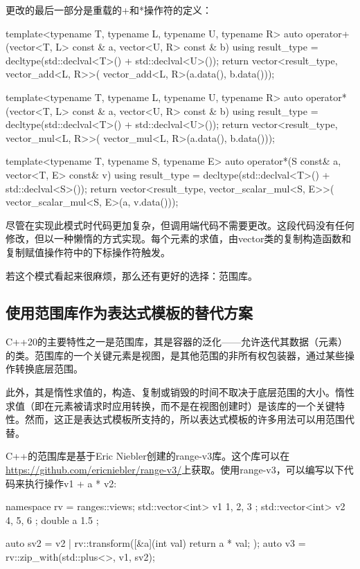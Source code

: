 更改的最后一部分是重载的+和*操作符的定义：

\begin{cppcode}
template<typename T, typename L, typename U, typename R>
auto operator+(vector<T, L> const & a,
vector<U, R> const & b)
{
	using result_type = decltype(std::declval<T>() +
								 std::declval<U>());
	return vector<result_type, vector_add<L, R>>(
		vector_add<L, R>(a.data(), b.data()));
}

template<typename T, typename L, typename U, typename R>
auto operator*(vector<T, L> const & a,
vector<U, R> const & b)
{
	using result_type = decltype(std::declval<T>() +
								 std::declval<U>());
	return vector<result_type, vector_mul<L, R>>(
		vector_mul<L, R>(a.data(), b.data()));
}

template<typename T, typename S, typename E>
auto operator*(S const& a, vector<T, E> const& v)
{
	using result_type = decltype(std::declval<T>() +
								 std::declval<S>());
	return vector<result_type, vector_scalar_mul<S, E>>(
		vector_scalar_mul<S, E>(a, v.data()));
}
\end{cppcode}

尽管在实现此模式时代码更加复杂，但调用端代码不需要更改。这段代码没有任何修改，但以一种懒惰的方式实现。每个元素的求值，由vector类的复制构造函数和复制赋值操作符中的下标操作符触发。

若这个模式看起来很麻烦，那么还有更好的选择：范围库。

\subsection{使用范围库作为表达式模板的替代方案}

C++20的主要特性之一是范围库，其是容器的泛化——允许迭代其数据（元素）的类。范围库的一个关键元素是视图，是其他范围的非所有权包装器，通过某些操作转换底层范围。

此外，其是惰性求值的，构造、复制或销毁的时间不取决于底层范围的大小。惰性求值（即在元素被请求时应用转换，而不是在视图创建时）是该库的一个关键特性。然而，这正是表达式模板所支持的，所以表达式模板的许多用法可以用范围代替。

C++的范围库是基于Eric Niebler创建的range-v3库。这个库可以在\url{https://github.com/ericniebler/range-v3/}上获取。使用range-v3，可以编写以下代码来执行操作v1 + a * v2:

\begin{cppcode}
namespace rv = ranges::views;
std::vector<int> v1{ 1, 2, 3 };
std::vector<int> v2{ 4, 5, 6 };
double a { 1.5 };

auto sv2 = v2 |
		   rv::transform([&a](int val) {return a * val; });
auto v3 = rv::zip_with(std::plus<>{}, v1, sv2);
\end{cppcode}

